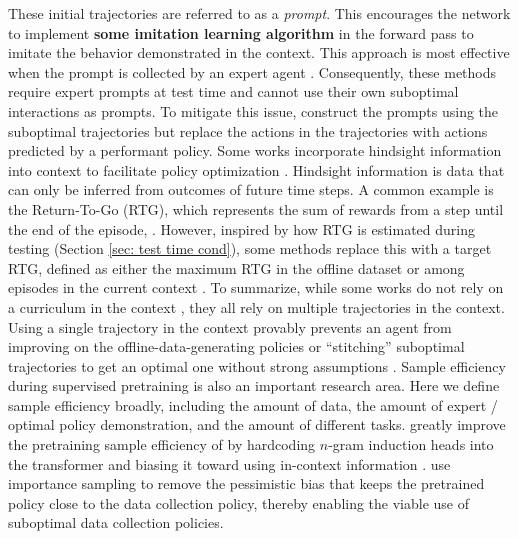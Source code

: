 \documentclass{article}
\newcommand{\tb}[1]{\textbf{#1}}
\begin{document}
These initial trajectories are referred to as a \textit{prompt}.
This encourages the network to implement \tb{some imitation learning algorithm} in the forward pass to imitate the behavior demonstrated in the context.
This approach is most effective when the prompt is collected by an expert agent \citep{raparthyGeneralizationNewSequential2023,xuPromptingDecisionTransformer2022}.
Consequently, these methods require expert prompts at test time and cannot use their own suboptimal interactions as prompts.
To mitigate this issue,
\citet{leeSupervisedPretrainingCan2023} construct the prompts using the suboptimal trajectories
but replace the actions in the trajectories with actions predicted by a performant policy.
Some works incorporate hindsight information into context to facilitate policy optimization \citep{furutaGeneralizedDecisionTransformer2022}.
Hindsight information is data that can only be inferred from outcomes of future time steps.
A common example is the Return-To-Go (RTG), which represents the sum of rewards from a step until the end of the episode,
\citep{xuPromptingDecisionTransformer2022, wangHierarchicalPromptDecision2024, daiContextExplorationExploitationReinforcement2024}.
However, inspired by how RTG is estimated during testing (Section \ref{sec: test time cond}), some methods replace this with a target RTG, defined as either the maximum RTG in the offline dataset \citep{schmiedLargeRecurrentAction2024} or among episodes in the current context \citep{huangContextDecisionTransformer2024, huangDecisionMambaReinforcement2024}.
To summarize,
while some works do not rely on a curriculum in the context \citep{leeSupervisedPretrainingCan2023},
they all rely on multiple trajectories in the context.
Using a single trajectory in the context \citep{chenDecisionTransformerReinforcement2021} provably prevents an agent from improving on the offline-data-generating policies
or ``stitching'' suboptimal trajectories to get an optimal one without strong assumptions \citep{brandfonbrenerWhenDoesReturnconditioned2023}.
Sample efficiency during supervised pretraining is also an important research area.
Here we define sample efficiency broadly,
including the amount of data, the amount of expert / optimal policy demonstration,
and the amount of different tasks.
\citet{zismanNGramInductionHeads2024} greatly improve the pretraining sample efficiency of \citet{laskinContextReinforcementLearning2022} by hardcoding $n$-gram induction heads into the transformer and biasing it toward using in-context information \citep{akyurekInContextLanguageLearning2024}.
\citet{daiContextExplorationExploitationReinforcement2024} use importance sampling to remove the pessimistic bias that keeps the pretrained policy close to the data collection policy, thereby enabling the viable use of suboptimal data collection policies.
\end{document}
